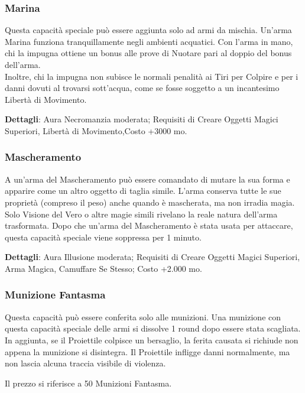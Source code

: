 \begin{multicols}{2}
\subsubsection{Marina}

Questa capacità speciale può essere aggiunta solo ad armi da mischia. Un'arma Marina funziona tranquillamente negli ambienti acquatici. Con l'arma in mano, chi la impugna ottiene un bonus alle prove di Nuotare pari al doppio del bonus dell'arma. \\
Inoltre, chi la impugna non subisce le normali penalità ai Tiri per Colpire e per i danni dovuti al trovarsi sott'acqua, come se fosse soggetto a un incantesimo Libertà di Movimento.

\textbf{Dettagli}: Aura Necromanzia moderata; Requisiti di Creare Oggetti Magici Superiori, Libertà di Movimento,Costo +3000 mo.

\subsubsection{Mascheramento}

A un'arma del Mascheramento può essere comandato di mutare la sua forma e apparire come un altro oggetto di taglia simile. L'arma conserva tutte le sue proprietà (compreso il peso) anche quando è mascherata, ma non irradia magia. Solo Visione del Vero o altre magie simili rivelano la reale natura dell'arma trasformata. Dopo che un'arma del Mascheramento è stata usata per attaccare, questa capacità speciale viene soppressa per 1 minuto.

\textbf{Dettagli}: Aura Illusione moderata; Requisiti di Creare Oggetti Magici Superiori, Arma Magica, Camuffare Se Stesso; Costo +2.000 mo.

\subsubsection{Munizione Fantasma}

Questa capacità può essere conferita solo alle munizioni. Una munizione con questa capacità speciale delle armi si dissolve 1 round dopo essere stata scagliata. In aggiunta, se il Proiettile colpisce un bersaglio, la ferita causata si richiude non appena la munizione si disintegra. Il Proiettile infligge danni normalmente, ma non lascia alcuna traccia visibile di violenza.

Il prezzo si riferisce a 50 Munizioni Fantasma.


\end{multicols}
